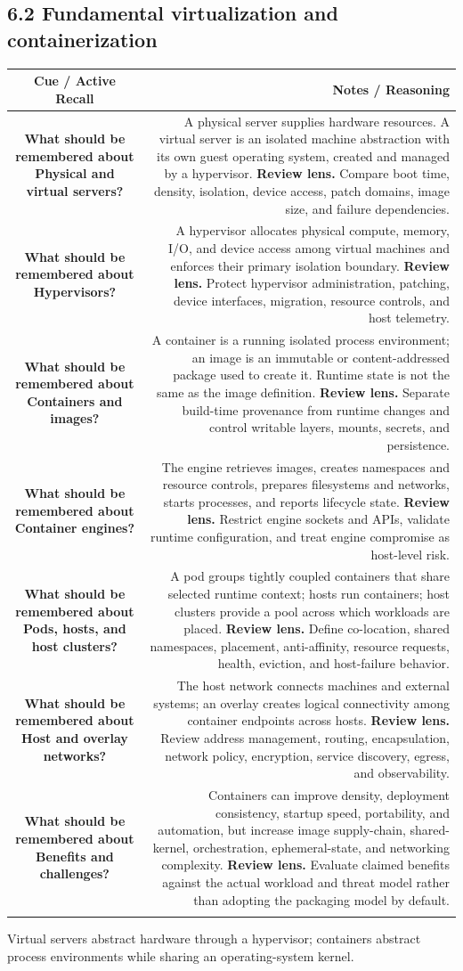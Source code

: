 \documentclass[11pt]{article}
\newcommand{\CornellHeader}{\rowcolor{Navy}\color{white}\bfseries Cue / Active Recall & \color{white}\bfseries Notes / Reasoning \\\endhead}
\newcommand{\CornellRow}[2]{\cellcolor{CueGray}\textbf{#1} & #2 \\\addlinespace[3pt]}
\begin{document}
\subsection{6.2 Fundamental virtualization and containerization}
\begin{longtable}{@{}C N@{}}
\CornellHeader
\CornellRow{What should be remembered about Physical and virtual servers?}{A physical server supplies hardware resources. A virtual server is an isolated machine abstraction with its own guest operating system, created and managed by a hypervisor. \textbf{Review lens.} Compare boot time, density, isolation, device access, patch domains, image size, and failure dependencies.}
\CornellRow{What should be remembered about Hypervisors?}{A hypervisor allocates physical compute, memory, I/O, and device access among virtual machines and enforces their primary isolation boundary. \textbf{Review lens.} Protect hypervisor administration, patching, device interfaces, migration, resource controls, and host telemetry.}
\CornellRow{What should be remembered about Containers and images?}{A container is a running isolated process environment; an image is an immutable or content-addressed package used to create it. Runtime state is not the same as the image definition. \textbf{Review lens.} Separate build-time provenance from runtime changes and control writable layers, mounts, secrets, and persistence.}
\CornellRow{What should be remembered about Container engines?}{The engine retrieves images, creates namespaces and resource controls, prepares filesystems and networks, starts processes, and reports lifecycle state. \textbf{Review lens.} Restrict engine sockets and APIs, validate runtime configuration, and treat engine compromise as host-level risk.}
\CornellRow{What should be remembered about Pods, hosts, and host clusters?}{A pod groups tightly coupled containers that share selected runtime context; hosts run containers; host clusters provide a pool across which workloads are placed. \textbf{Review lens.} Define co-location, shared namespaces, placement, anti-affinity, resource requests, health, eviction, and host-failure behavior.}
\CornellRow{What should be remembered about Host and overlay networks?}{The host network connects machines and external systems; an overlay creates logical connectivity among container endpoints across hosts. \textbf{Review lens.} Review address management, routing, encapsulation, network policy, encryption, service discovery, egress, and observability.}
\CornellRow{What should be remembered about Benefits and challenges?}{Containers can improve density, deployment consistency, startup speed, portability, and automation, but increase image supply-chain, shared-kernel, orchestration, ephemeral-state, and networking complexity. \textbf{Review lens.} Evaluate claimed benefits against the actual workload and threat model rather than adopting the packaging model by default.}
\end{longtable}
\begin{sectionsummarybox}
Virtual servers abstract hardware through a hypervisor; containers abstract process environments while sharing an operating-system kernel.
\end{sectionsummarybox}
\end{document}
